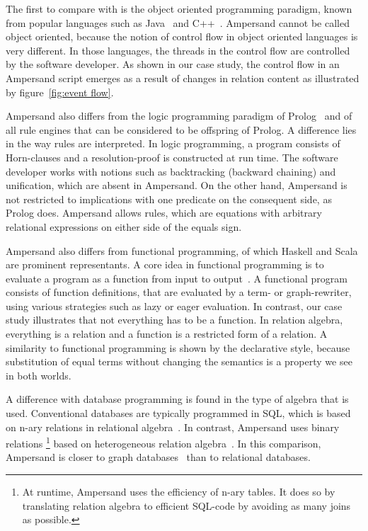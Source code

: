 \documentclass{elsarticle}
\begin{document}
	The first to compare with is the object oriented programming paradigm, known from popular languages such as Java~\cite{Java} and C++~\cite{Stroustrup97a}.
	Ampersand cannot be called object oriented, because the notion of control flow in object oriented languages is very different.
	In those languages, the threads in the control flow are controlled by the software developer.
	As shown in our case study, the control flow in an Ampersand script emerges as a result of changes in relation content as illustrated
	by figure~\ref{fig:event flow}.

	Ampersand also differs from the logic programming paradigm of Prolog~\cite{Lloyd1984}
	and of all rule engines that can be considered to be offspring of Prolog.
	A difference lies in the way rules are interpreted.
	In logic programming, a program consists of Horn-clauses and a resolution-proof is constructed at run time.
	The software developer works with notions such as backtracking (backward chaining) and unification, which are absent in Ampersand.
	On the other hand, Ampersand is not restricted to implications with one predicate on the consequent side, as Prolog does.
        Ampersand allows rules, which are equations with arbitrary relational expressions on either side of the equals sign.

	Ampersand also differs from functional programming, of which Haskell and Scala are prominent representants.
	A core idea in functional programming is to evaluate a program as a function from input to output~\cite{Backus1978}.
	A functional program consists of function definitions, that are evaluated by a term- or graph-rewriter,
	using various strategies such as lazy or eager evaluation.
	In contrast, our case study illustrates that not everything has to be a function.
	In relation algebra, everything is a relation and a function is a restricted form of a relation.
	A similarity to functional programming is shown by the declarative style,
	because substitution of equal terms without changing the semantics is a property we see in both worlds.

	A difference with database programming is found in the type of algebra that is used.
	Conventional databases are typically programmed in SQL, which is based on n-ary relations in relational algebra~\cite{Codd70}.
	In contrast, Ampersand uses binary relations%
\footnote{At runtime, Ampersand uses the efficiency of n-ary tables. It does so by translating relation algebra to efficient SQL-code by avoiding as many joins as possible.}
	based on heterogeneous relation algebra~\cite{Schmidt1997}.
	In this comparison, Ampersand is closer to graph databases~\cite{Vicknair2010} than to relational databases.
\end{document}
